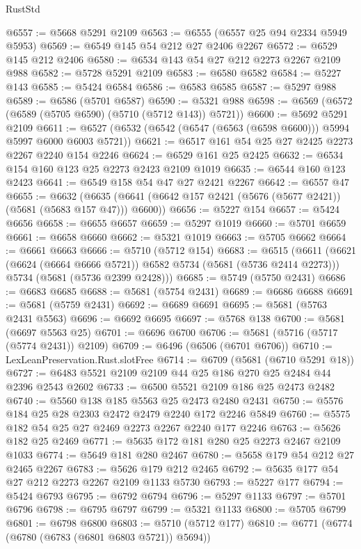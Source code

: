 \begin{lexlean}{RustStd}
\begin{coremodule}
@6557 := @5668 @5291 @2109
@6563 := @6555 (@6557 @25 @94 @2334 @5949 @5953)
@6569 := @6549 @145 @54 @212 @27 @2406 @2267
@6572 := @6529 @145 @212 @2406
@6580 := @6534 @143 @54 @27 @212 @2273 @2267 @2109 @988
@6582 := @5728 @5291 @2109
@6583 := @6580 @6582
@6584 := @5227 @143
@6585 := @5424 @6584
@6586 := @6583 @6585
@6587 := @5297 @988
@6589 := @6586 (@5701 @6587)
@6590 := @5321 @988
@6598 := @6569 (@6572 (@6589 (@5705 @6590) (@5710 (@5712 @143)) @5721))
@6600 := @5692 @5291 @2109
@6611 := @6527 (@6532 (@6542 (@6547 (@6563 (@6598 @6600))) @5994 @5997 @6000 @6003 @5721))
@6621 := @6517 @161 @54 @25 @27 @2425 @2273 @2267 @2240 @154 @2246
@6624 := @6529 @161 @25 @2425
@6632 := @6534 @154 @160 @123 @25 @2273 @2423 @2109 @1019
@6635 := @6544 @160 @123 @2423
@6641 := @6549 @158 @54 @47 @27 @2421 @2267
@6642 := @6557 @47
@6655 := @6632
    (@6635 (@6641 (@6642 @157 @2421 (@5676 (@5677 @2421)) (@5681 (@5683 @157 @47))) @6600))
@6656 := @5227 @154
@6657 := @5424 @6656
@6658 := @6655 @6657
@6659 := @5297 @1019
@6660 := @5701 @6659
@6661 := @6658 @6660
@6662 := @5321 @1019
@6663 := @5705 @6662
@6664 := @6661 @6663
@6666 := @5710 (@5712 @154)
@6683 := @6515
    (@6611
      (@6621 (@6624 (@6664 @6666 @5721)) @6582 @5734 (@5681 (@5736 @2414 @2273)))
      @5734
      (@5681 (@5736 @2399 @2428)))
@6685 := @5749 (@5750 @2431)
@6686 := @6683 @6685
@6688 := @5681 (@5754 @2431)
@6689 := @6686 @6688
@6691 := @5681 (@5759 @2431)
@6692 := @6689 @6691
@6695 := @5681 (@5763 @2431 @5563)
@6696 := @6692 @6695
@6697 := @5768 @138
@6700 := @5681 (@6697 @5563 @25)
@6701 := @6696 @6700
@6706 := @5681 (@5716 (@5717 (@5774 @2431)) @2109)
@6709 := @6496 (@6506 (@6701 @6706))
@6710 := LexLeanPreservation.Rust.slotFree
@6714 := @6709 (@5681 (@6710 @5291 @18))
@6727 := @6483 @5521 @2109 @2109 @44 @25 @186 @270 @25 @2484 @44 @2396 @2543 @2602
@6733 := @6500 @5521 @2109 @186 @25 @2473 @2482
@6740 := @5560 @138 @185 @5563 @25 @2473 @2480 @2431
@6750 := @5576 @184 @25 @28 @2303 @2472 @2479 @2240 @172 @2246 @5849
@6760 := @5575 @182 @54 @25 @27 @2469 @2273 @2267 @2240 @177 @2246
@6763 := @5626 @182 @25 @2469
@6771 := @5635 @172 @181 @280 @25 @2273 @2467 @2109 @1033
@6774 := @5649 @181 @280 @2467
@6780 := @5658 @179 @54 @212 @27 @2465 @2267
@6783 := @5626 @179 @212 @2465
@6792 := @5635 @177 @54 @27 @212 @2273 @2267 @2109 @1133 @5730
@6793 := @5227 @177
@6794 := @5424 @6793
@6795 := @6792 @6794
@6796 := @5297 @1133
@6797 := @5701 @6796
@6798 := @6795 @6797
@6799 := @5321 @1133
@6800 := @5705 @6799
@6801 := @6798 @6800
@6803 := @5710 (@5712 @177)
@6810 := @6771 (@6774 (@6780 (@6783 (@6801 @6803 @5721)) @5694))

\end{coremodule}
\end{lexlean}
